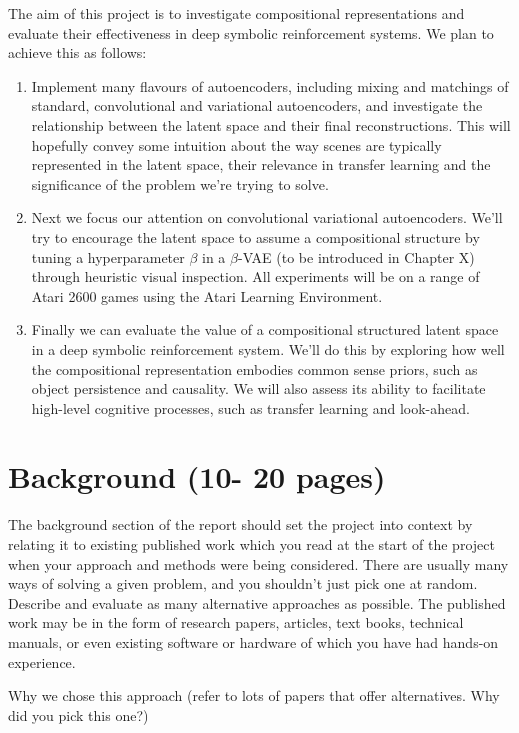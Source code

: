 \documentclass[12pt,twoside]{article}
\begin{document}
The aim of this project is to investigate compositional representations and evaluate their effectiveness in deep symbolic reinforcement systems. We plan to achieve this as follows:

\begin{enumerate}
\item Implement many flavours of autoencoders, including mixing and matchings of standard, convolutional and variational autoencoders, and investigate the relationship between the latent space and their final reconstructions. This will hopefully convey some intuition about the way scenes are typically represented in the latent space, their relevance in transfer learning and the significance of the problem we're trying to solve.
\item Next we focus our attention on convolutional variational autoencoders. We'll try to encourage the latent space to assume a compositional structure by tuning a hyperparameter $\beta$ in a $\beta$-VAE (to be introduced in Chapter X) through heuristic visual inspection. All experiments will be on a range of Atari 2600 games using the Atari Learning Environment.
\item Finally we can evaluate the value of a compositional structured latent space in a deep symbolic reinforcement system. We'll do this by exploring how well the compositional representation embodies common sense priors, such as object persistence and causality. We will also assess its ability to facilitate high-level cognitive processes, such as transfer learning and look-ahead.
\end{enumerate}

\section{Background (10- 20 pages)}
The background section of the report should set the project into context by relating it to existing published work which you read at the start of the project when your approach and methods were being considered. There are usually many ways of solving a given problem, and you shouldn't just pick one at random. Describe and evaluate as many alternative approaches as possible. The published work may be in the form of research papers, articles, text books, technical manuals, or even existing software or hardware of which you have had hands-on experience.

Why we chose this approach (refer to lots of papers that offer alternatives. Why did you pick this one?)\\
\end{document}
